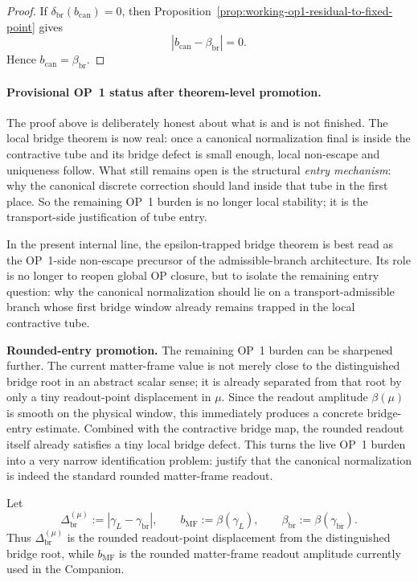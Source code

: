 \begin{proof}
If \(\delta_{\mathrm{br}}(b_{\mathrm{can}})=0\), then Proposition~\ref{prop:working-op1-residual-to-fixed-point} gives
\[
 |b_{\mathrm{can}}-\beta_{\mathrm{br}}|=0.
\]
Hence \(b_{\mathrm{can}}=\beta_{\mathrm{br}}\).
\end{proof}

\paragraph{Provisional OP~1 status after theorem-level promotion.}
The proof above is deliberately honest about what is and is not finished. The local bridge theorem is now real: once a canonical normalization final is inside the contractive tube and its bridge defect is small enough, local non-escape and uniqueness follow. What still remains open is the structural \emph{entry mechanism}: why the canonical discrete correction should land inside that tube in the first place. So the remaining OP~1 burden is no longer local stability; it is the transport-side justification of tube entry.

\begin{remark}
In the present internal line, the epsilon-trapped bridge theorem is best read as the OP~1-side non-escape precursor of the admissible-branch architecture. Its role is no longer to reopen global OP closure, but to isolate the remaining entry question: why the canonical normalization should lie on a transport-admissible branch whose first bridge window already remains trapped in the local contractive tube.
\end{remark}


\noindent\textbf{Rounded-entry promotion.} The remaining OP~1 burden can be sharpened further. The current matter-frame value is not merely close to the distinguished bridge root in an abstract scalar sense; it is already separated from that root by only a tiny readout-point displacement in \(\mu\). Since the readout amplitude \(\beta(\mu)\) is smooth on the physical window, this immediately produces a concrete bridge-entry estimate. Combined with the contractive bridge map, the rounded readout itself already satisfies a tiny local bridge defect. This turns the live OP~1 burden into a very narrow identification problem: justify that the canonical normalization is indeed the standard rounded matter-frame readout.

\begin{definition}
\label{def:working-op1-rounded-gap}
Let
\[
 \Delta^{(\mu)}_{\mathrm{br}}
 :=
 |\gamma_L-\gamma_{\mathrm{br}}|,
 \qquad
 b_{\mathrm{MF}}:=\beta(\gamma_L),
 \qquad
 \beta_{\mathrm{br}}:=\beta(\gamma_{\mathrm{br}}).
\]
Thus \(\Delta^{(\mu)}_{\mathrm{br}}\) is the rounded readout-point displacement from the distinguished bridge root, while \(b_{\mathrm{MF}}\) is the rounded matter-frame readout amplitude currently used in the Companion.
\end{definition}

